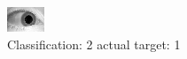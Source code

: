 \begin{figure}[h!]
\begin{center}
\includegraphics[width=0.60\columnwidth]{figures/ID1528_class_2_target_1.png}
\end{center}
\caption{ Classification: 2 actual target: 1}
\label{fig:ID1528_class_2_target_1}
\end{figure}
